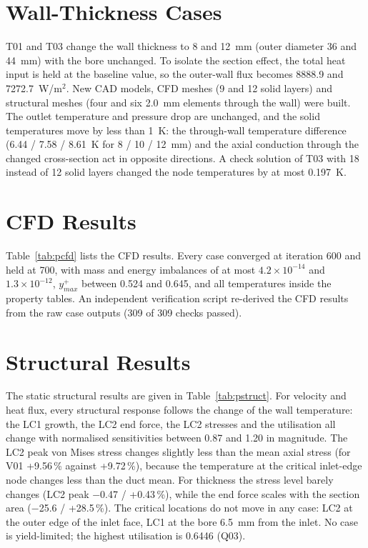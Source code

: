 \section{Wall-Thickness Cases}
T01 and T03 change the wall thickness to 8 and 12~mm (outer diameter 36 and 44~mm) with the bore unchanged. To isolate the section effect,
the total heat input is held at the baseline value, so the outer-wall flux becomes 8888.9 and 7272.7~W/m$^2$. New CAD models, CFD meshes
(9 and 12 solid layers) and structural meshes (four and six 2.0~mm elements through the wall) were built. The outlet temperature and pressure drop are unchanged,
and the solid temperatures move by less than 1~K: the through-wall temperature difference (6.44 / 7.58 / 8.61~K for 8 / 10 / 12~mm) and the
axial conduction through the changed cross-section act in opposite directions. A check solution of T03 with 18 instead of 12 solid layers
changed the node temperatures by at most 0.197~K.


\section{CFD Results}
Table~\ref{tab:pcfd} lists the CFD results. Every case converged at iteration 600 and held at 700, with mass and energy imbalances of at most
$4.2\times10^{-14}$ and $1.3\times10^{-12}$, $y^+_{max}$ between 0.524 and 0.645, and all temperatures inside the property tables. An independent
verification script re-derived the CFD results from the raw case outputs (309 of 309 checks passed).



\section{Structural Results}
The static structural results are given in Table~\ref{tab:pstruct}. For velocity and heat flux, every structural response follows the change
of the wall temperature: the LC1 growth, the LC2 end force, the LC2 stresses and the utilisation all change with normalised sensitivities
between 0.87 and 1.20 in magnitude. The LC2 peak von Mises stress changes slightly less than the mean axial stress (for V01 +9.56\,\% against
+9.72\,\%), because the temperature at the critical inlet-edge node changes less than the duct mean. For thickness the stress level barely
changes (LC2 peak $-$0.47 / +0.43\,\%), while the end force scales with the section area ($-$25.6 / +28.5\,\%). The critical locations do not move
in any case: LC2 at the outer edge of the inlet face, LC1 at the bore 6.5~mm from the inlet. No case is yield-limited; the highest
utilisation is 0.6446 (Q03).

